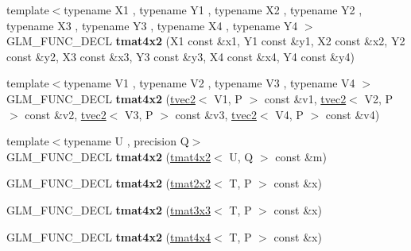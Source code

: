 \begin{DoxyCompactItemize}
\item 
\hypertarget{structglm_1_1detail_1_1tmat4x2_a7999df24927e0ce901b39f396c529692}{{\footnotesize template$<$typename X1 , typename Y1 , typename X2 , typename Y2 , typename X3 , typename Y3 , typename X4 , typename Y4 $>$ }\\G\-L\-M\-\_\-\-F\-U\-N\-C\-\_\-\-D\-E\-C\-L {\bfseries tmat4x2} (X1 const \&x1, Y1 const \&y1, X2 const \&x2, Y2 const \&y2, X3 const \&x3, Y3 const \&y3, X4 const \&x4, Y4 const \&y4)}\label{structglm_1_1detail_1_1tmat4x2_a7999df24927e0ce901b39f396c529692}

\item 
\hypertarget{structglm_1_1detail_1_1tmat4x2_abbb030181da4728bc6d618aa24aa17a8}{{\footnotesize template$<$typename V1 , typename V2 , typename V3 , typename V4 $>$ }\\G\-L\-M\-\_\-\-F\-U\-N\-C\-\_\-\-D\-E\-C\-L {\bfseries tmat4x2} (\hyperlink{structglm_1_1detail_1_1tvec2}{tvec2}$<$ V1, P $>$ const \&v1, \hyperlink{structglm_1_1detail_1_1tvec2}{tvec2}$<$ V2, P $>$ const \&v2, \hyperlink{structglm_1_1detail_1_1tvec2}{tvec2}$<$ V3, P $>$ const \&v3, \hyperlink{structglm_1_1detail_1_1tvec2}{tvec2}$<$ V4, P $>$ const \&v4)}\label{structglm_1_1detail_1_1tmat4x2_abbb030181da4728bc6d618aa24aa17a8}

\item 
\hypertarget{structglm_1_1detail_1_1tmat4x2_a4aa43b25aaebbe320d3442f1a222c229}{{\footnotesize template$<$typename U , precision Q$>$ }\\G\-L\-M\-\_\-\-F\-U\-N\-C\-\_\-\-D\-E\-C\-L {\bfseries tmat4x2} (\hyperlink{structglm_1_1detail_1_1tmat4x2}{tmat4x2}$<$ U, Q $>$ const \&m)}\label{structglm_1_1detail_1_1tmat4x2_a4aa43b25aaebbe320d3442f1a222c229}

\item 
\hypertarget{structglm_1_1detail_1_1tmat4x2_a0092bc7d0c201c76adfe3ae1b7a78cdf}{G\-L\-M\-\_\-\-F\-U\-N\-C\-\_\-\-D\-E\-C\-L {\bfseries tmat4x2} (\hyperlink{structglm_1_1detail_1_1tmat2x2}{tmat2x2}$<$ T, P $>$ const \&x)}\label{structglm_1_1detail_1_1tmat4x2_a0092bc7d0c201c76adfe3ae1b7a78cdf}

\item 
\hypertarget{structglm_1_1detail_1_1tmat4x2_a1c7da56ef91ddbc093c429aa5e02da6b}{G\-L\-M\-\_\-\-F\-U\-N\-C\-\_\-\-D\-E\-C\-L {\bfseries tmat4x2} (\hyperlink{structglm_1_1detail_1_1tmat3x3}{tmat3x3}$<$ T, P $>$ const \&x)}\label{structglm_1_1detail_1_1tmat4x2_a1c7da56ef91ddbc093c429aa5e02da6b}

\item 
\hypertarget{structglm_1_1detail_1_1tmat4x2_a5a1ee2297426e9d916cef04f76bf7030}{G\-L\-M\-\_\-\-F\-U\-N\-C\-\_\-\-D\-E\-C\-L {\bfseries tmat4x2} (\hyperlink{structglm_1_1detail_1_1tmat4x4}{tmat4x4}$<$ T, P $>$ const \&x)}\label{structglm_1_1detail_1_1tmat4x2_a5a1ee2297426e9d916cef04f76bf7030}


\end{DoxyCompactItemize}
